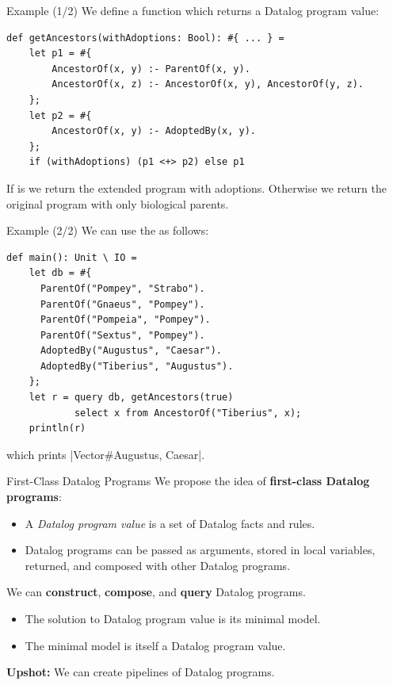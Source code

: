 \begin{frame}[fragile]{Example (1/2)}
We define a function which returns a Datalog program value:

\begin{lstlisting}[language=flix, xleftmargin=0.8cm]
def getAncestors(withAdoptions: Bool): #{ ... } =
    let p1 = #{
        AncestorOf(x, y) :- ParentOf(x, y).
        AncestorOf(x, z) :- AncestorOf(x, y), AncestorOf(y, z).
    };
    let p2 = #{
        AncestorOf(x, y) :- AdoptedBy(x, y). 
    };
    if (withAdoptions) (p1 <+> p2) else p1
\end{lstlisting}

If  is  we return the extended program with
adoptions. Otherwise we return the original program with only biological
parents. 
\end{frame}

\begin{frame}[fragile]{Example (2/2)}
We can use the  as follows:

\begin{lstlisting}[language=flix, xleftmargin=0.8cm]
def main(): Unit \ IO = 
    let db = #{
      ParentOf("Pompey", "Strabo").
      ParentOf("Gnaeus", "Pompey").
      ParentOf("Pompeia", "Pompey").
      ParentOf("Sextus", "Pompey").
      AdoptedBy("Augustus", "Caesar").
      AdoptedBy("Tiberius", "Augustus").
    };
    let r = query db, getAncestors(true) 
            select x from AncestorOf("Tiberius", x);
    println(r)
\end{lstlisting}

which prints \Code|Vector#{Augustus, Caesar}|.
\end{frame}

\begin{frame}{First-Class Datalog Programs}
We propose the idea of \textbf{first-class Datalog programs}:

\begin{itemize}
    \item A \emph{Datalog program value} is a set of Datalog facts and rules.
    \item Datalog programs can be passed as arguments, stored in local
    variables, returned, and composed with other Datalog programs.
\end{itemize}

We can \textbf{construct}, \textbf{compose}, and \textbf{query} Datalog programs.

\begin{itemize}
    \item The solution to Datalog program value is its minimal model.
    \item The minimal model is itself a Datalog program value.
\end{itemize}

\textbf{Upshot:} We can create pipelines of Datalog programs.
\end{frame}

